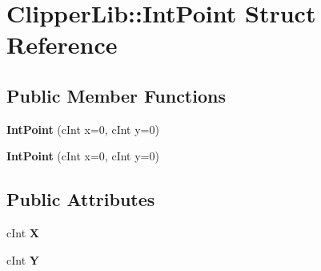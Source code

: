 \hypertarget{structClipperLib_1_1IntPoint}{}\section{Clipper\+Lib\+:\+:Int\+Point Struct Reference}
\label{structClipperLib_1_1IntPoint}
\subsection*{Public Member Functions}
\begin{DoxyCompactItemize}
\item 
\mbox{\label{structClipperLib_1_1IntPoint_a819e71f9269e99f151a3a99c4283cd43}} 
{\bfseries Int\+Point} (c\+Int x=0, c\+Int y=0)
\item 
\mbox{\label{structClipperLib_1_1IntPoint_a819e71f9269e99f151a3a99c4283cd43}} 
{\bfseries Int\+Point} (c\+Int x=0, c\+Int y=0)
\end{DoxyCompactItemize}
\subsection*{Public Attributes}
\begin{DoxyCompactItemize}
\item 
\mbox{\label{structClipperLib_1_1IntPoint_a608d16d39c8762e6c3c0a688efb310b6}} 
c\+Int {\bfseries X}
\item 
\mbox{\label{structClipperLib_1_1IntPoint_a8445d190cd9013bb34d49b5a8a240425}} 
c\+Int {\bfseries Y}
\end{DoxyCompactItemize}
